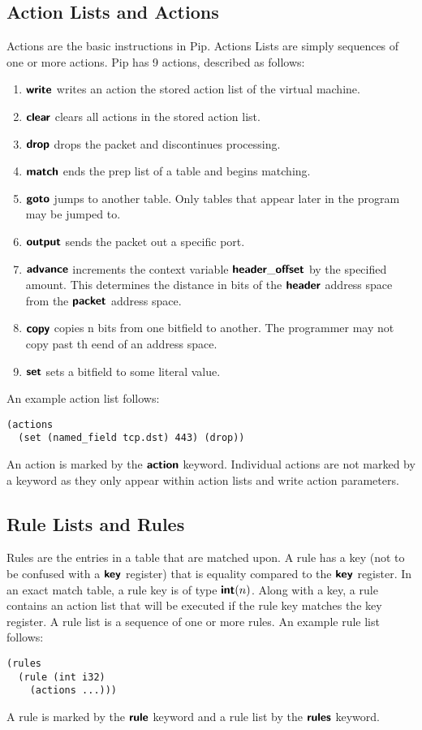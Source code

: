 \subsection{Action Lists and Actions}
Actions are the basic instructions in Pip. Actions Lists are simply sequences of one or more actions. Pip has 9 actions, described as follows: 
\begin{enumerate}
  \item $\bm{\mathsf{{write}}}$ writes an action the stored action list of the virtual machine. 
  \item $\bm{\mathsf{{clear}}}$ clears all actions in the stored action list.
  \item $\bm{\mathsf{{drop}}}$ drops the packet and discontinues processing.
  \item $\bm{\mathsf{{match}}}$ ends the prep list of a table and begins matching.
  \item $\bm{\mathsf{{goto}}}$ jumps to another table. Only tables that appear later in the program may be jumped to.
  \item $\bm{\mathsf{{output}}}$ sends the packet out a specific port.
  \item $\bm{\mathsf{{advance}}}$ increments the context variable $\bm{\mathsf{{header\_offset}}}$ by the specified amount. This determines the distance in bits of the $\bm{\mathsf{{header}}}$ address space from the $\bm{\mathsf{{packet}}}$ address space.
  \item $\bm{\mathsf{{copy}}}$ copies n bits from one bitfield to another. The programmer may not copy past th eend of an address space.
  \item $\bm{\mathsf{{set}}}$ sets a bitfield to some literal value.
\end{enumerate}
An example action list follows:
\begin{mdframed}
\begin{verbatim}
(actions
  (set (named_field tcp.dst) 443) (drop))
\end{verbatim}
\end{mdframed}
An action is marked by the $\bm{\mathsf{{action}}}$ keyword. Individual actions are not marked by a keyword as they only appear within action lists and write action parameters.

\subsection{Rule Lists and Rules}
Rules are the entries in a table that are matched upon. A rule has a key (not to be confused with a $\bm{\mathsf{{key}}}$ register) that is equality compared to the $\bm{\mathsf{{key}}}$ register. In an exact match table, a rule key is of type $\bm{\mathsf{{int}}}(n)$. Along with a key, a rule contains an action list that will be executed if the rule key matches the key register. A rule list is a sequence of one or more rules. An example rule list follows:
\begin{mdframed}
\begin{verbatim}
(rules
  (rule (int i32)
    (actions ...)))
\end{verbatim}
\end{mdframed}
A rule is marked by the $\bm{\mathsf{{rule}}}$ keyword and a rule list by the $\bm{\mathsf{{rules}}}$ keyword.

